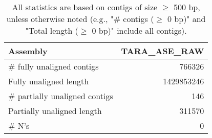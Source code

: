 \documentclass[12pt,a4paper]{article}
\begin{document}
\begin{table}[ht]
\begin{center}
\caption{All statistics are based on contigs of size $\geq$ 500 bp, unless otherwise noted (e.g., "\# contigs ($\geq$ 0 bp)" and "Total length ($\geq$ 0 bp)" include all contigs).}
\begin{tabular}{|l*{1}{|r}|}
\hline
Assembly & TARA\_ASE\_RAW \\ \hline
\# fully unaligned contigs & 766326 \\ \hline
Fully unaligned length & 1429853246 \\ \hline
\# partially unaligned contigs & 146 \\ \hline
Partially unaligned length & 311570 \\ \hline
\# N's & 0 \\ \hline
\end{tabular}
\end{center}
\end{table}
\end{document}
